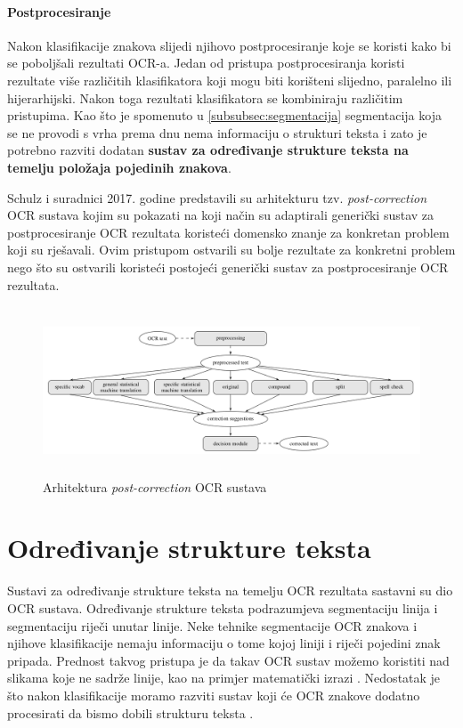 \documentclass[times, utf8, zavrsni]{fer}
\begin{document}
\subsubsection{Postprocesiranje}

Nakon klasifikacije znakova slijedi njihovo postprocesiranje koje se koristi kako
bi se poboljšali rezultati OCR-a. Jedan od pristupa postprocesiranja koristi rezultate
više različitih klasifikatora koji mogu biti korišteni slijedno, paralelno ili hijerarhijski.
Nakon toga rezultati klasifikatora se kombiniraju različitim pristupima. \citep{DBLP:journals/corr/abs-1710-05703}
Kao što je spomenuto u \ref{subsubsec:segmentacija} segmentacija koja se ne provodi s vrha prema
dnu nema informaciju o strukturi teksta i zato je potrebno razviti dodatan
\textbf{sustav za određivanje strukture teksta na temelju položaja pojedinih znakova}.

Schulz i suradnici \citep{schulz2017multi} 2017. godine predstavili su arhitekturu
tzv. \emph{post-correction} OCR sustava kojim su pokazati na koji način su
adaptirali generički sustav za postprocesiranje OCR rezultata koristeći domensko znanje
za konkretan problem koji su rješavali. Ovim pristupom ostvarili su bolje rezultate
za konkretni problem nego što su ostvarili koristeći postojeći generički sustav za
postprocesiranje OCR rezultata.

\begin{figure}[htb]
    \centering
    \includegraphics[height=5cm]{images/post-correction-example-01.png}
    \caption{Arhitektura \emph{post-correction} OCR sustava \citep{schulz2017multi}}
    \label{fig:post-correction-example-01}
\end{figure}

\chapter{Određivanje strukture teksta}
Sustavi za određivanje strukture teksta na temelju OCR rezultata sastavni su dio OCR sustava. Određivanje strukture teksta
podrazumjeva segmentaciju linija i segmentaciju riječi unutar linije. Neke tehnike segmentacije
OCR znakova i njihove klasifikacije nemaju informaciju o tome kojoj liniji i riječi pojedini znak pripada.
Prednost takvog pristupa je da takav OCR sustav možemo koristiti nad slikama koje ne sadrže linije,
kao na primjer matematički izrazi \citep{Jurin:2017:Master}. Nedostatak je što nakon klasifikacije
moramo razviti sustav koji će OCR znakove dodatno procesirati da bismo dobili strukturu teksta \citep{Jurin:2017:Master}.
\end{document}
